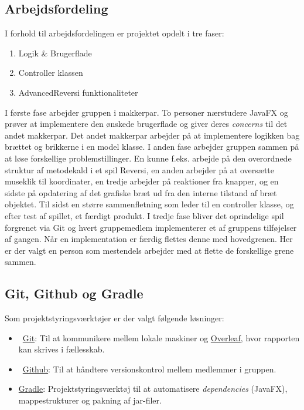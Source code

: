 \subsection{Arbejdsfordeling}
I forhold til arbejdsfordelingen er projektet opdelt i tre faser:
\begin{enumerate}
    \item Logik \& Brugerflade
    \item Controller klassen
    \item AdvancedReversi funktionaliteter
\end{enumerate}
I første fase arbejder gruppen i makkerpar. To personer nærstudere JavaFX og prøver at implementere den ønskede brugerflade og giver deres \emph{concerns} til det andet makkerpar. Det andet makkerpar arbejder på at implementere logikken bag brættet og brikkerne i en model klasse.\newline
I anden fase arbejder gruppen sammen på at løse forskellige problemstillinger. En kunne f.eks. arbejde på den overordnede struktur af metodekald i et spil Reversi, en anden arbejder på at oversætte museklik til koordinater, en tredje arbejder på reaktioner fra knapper, og en sidste på opdatering af det grafiske bræt ud fra den interne tilstand af bræt objektet. Til sidst en større sammenfletning som leder til en controller klasse, og efter test af spillet, et færdigt produkt.
I tredje fase bliver det oprindelige spil forgrenet via Git og hvert gruppemedlem implementerer et af gruppens tilføjelser af gangen. Når en implementation er færdig flettes denne med hovedgrenen. Her er der valgt en person som mestendels arbejder med at flette de forskellige grene sammen.
\subsection{Git, Github og Gradle}\label{sec:GGG}
Som projektstyringsværktøjer er der valgt følgende løsninger:
\begin{itemize}
    \item \faGit \ \href{https://git-scm.com/}{Git}: Til at kommunikere mellem lokale maskiner og \href{https://www.overleaf.com/}{Overleaf}, hvor rapporten kan skrives i fællesskab.
    \item \faGithub \ \href{https://github.com/}{Github}: Til at håndtere versionskontrol mellem medlemmer i gruppen.
    \item \href{https://gradle.org/}{Gradle}: Projektstyringsværktøj til at automatisere \emph{dependencies} (JavaFX), mappestrukturer og pakning af jar-filer.
\end{itemize}
